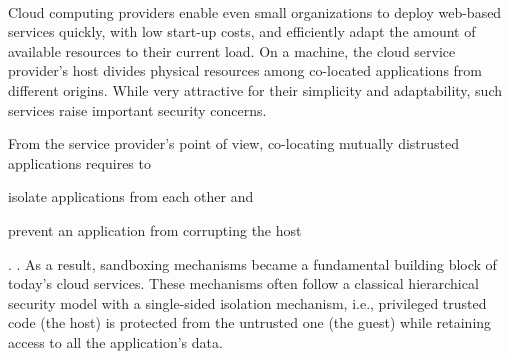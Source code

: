 %
%
%

\\

Cloud computing providers enable even small organizations to deploy web-based services quickly, with low start-up costs, and efficiently adapt the amount of available resources to their current load.
On a machine, the cloud service provider's host divides physical resources among co-located applications from different origins.
While very attractive for their simplicity and adaptability, such services raise important security concerns.

From the service provider's point of view, co-locating mutually distrusted applications requires to
\begin{enumerate*}
	\item isolate applications from each other and
	\item prevent an application from corrupting the host
\end{enumerate*}.
.
As a result, sandboxing mechanisms became a fundamental building block of today's cloud services.
These mechanisms often follow a classical hierarchical security model with a single-sided isolation mechanism, i.e., privileged trusted code (the host) is protected from the untrusted one (the guest) while retaining access to all the application's data.

